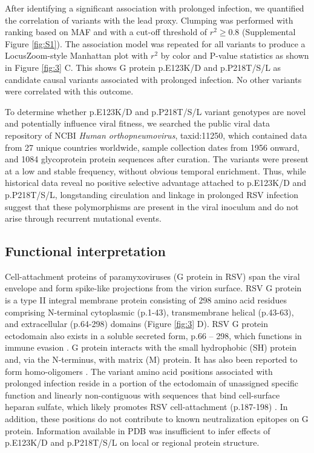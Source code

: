 \documentclass{article} %
\begin{document}
After identifying a significant association with prolonged infection,
we quantified the correlation of variants with the lead proxy.
Clumping was performed with ranking based on MAF and with a cut-off threshold of $r^2 \ge 0.8$ (Supplemental Figure \ref{fig:S1}).
The association model was repeated for all variants to produce a LocusZoom-style Manhattan plot with $r^2$ by color and P-value statistics as shown in 
Figure \ref{fig:3} C.
This shows G protein 
p.E123K/D and 
p.P218T/S/L as candidate causal variants associated with prolonged infection. 
No other variants were correlated with this outcome. 

To determine whether p.E123K/D and p.P218T/S/L variant genotypes are novel and potentially influence viral fitness, we searched  the public viral data repository of NCBI \textit{Human orthopneumovirus}, taxid:11250, which contained data from 
27 unique countries worldwide, sample collection dates from 1956 onward, and 1084 glycoprotein protein sequences after curation.
The variants were present at a low and stable frequency, without obvious temporal enrichment. 
Thus, while historical data reveal no positive selective advantage attached to p.E123K/D and p.P218T/S/L, longstanding circulation and linkage in prolonged RSV infection suggest that these polymorphisms are present in the viral inoculum and do not arise through recurrent mutational events.

\subsection{Functional interpretation}
Cell-attachment proteins of paramyxoviruses (G protein in RSV) span the viral envelope and form spike-like projections from the virion surface. 
RSV G protein is a type II integral membrane protein consisting of 298 amino acid residues comprising N-terminal cytoplasmic (p.1-43), transmembrane helical (p.43-63), and extracellular (p.64-298) domains 
(Figure \ref{fig:3} D). 
RSV G protein ectodomain also exists in a soluble secreted form, p.66 – 298, which functions in immune evasion 
\citep{levine1987demonstration, feldman1999identification, feldman2000fusion}.
G protein interacts with the small hydrophobic (SH) protein 
\citep{rixon2005respiratory}
and, via the N-terminus, with matrix (M) 
\citep{ghildyal2005interaction} 
protein.
It has also been reported to form homo-oligomers 
\citep{collins1992oligomerization}.
The variant amino acid positions associated with prolonged infection reside in a portion of the ectodomain of unassigned specific function and linearly non-contiguous with sequences that bind cell-surface heparan sulfate, which likely promotes RSV cell-attachment (p.187-198)
\citep{levine1987demonstration, feldman1999identification, feldman2000fusion}.
In addition, these positions do not contribute to known neutralization epitopes on G protein. Information available in PDB was insufficient to infer effects of p.E123K/D and p.P218T/S/L on local or regional protein structure. 
\end{document}
